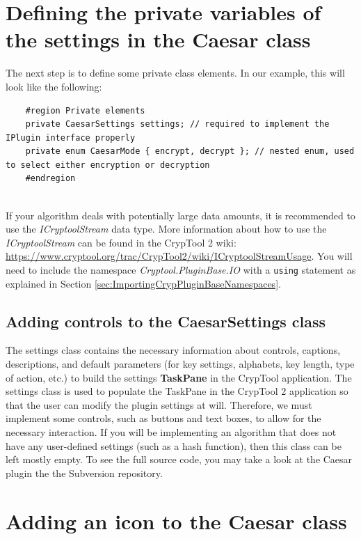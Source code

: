 \section{Defining the private variables of the settings in the Caesar class}
\label{sec:DefiningThePrivateVariablesOfTheSettingsInTheCaesarClass}

The next step is to define some private class elements. In our example, this will look like the following:

\begin{lstlisting}
	#region Private elements
	private CaesarSettings settings; // required to implement the IPlugin interface properly
	private enum CaesarMode { encrypt, decrypt }; // nested enum, used to select either encryption or decryption
	#endregion
\end{lstlisting}

\ \\
If your algorithm deals with potentially large data amounts, it is recommended to use the \textit{ICryptoolStream} data type. More information about how to use the \textit{ICryptoolStream} can be found in the CrypTool 2 wiki: \url{https://www.cryptool.org/trac/CrypTool2/wiki/ICryptoolStreamUsage}. You will need to include the namespace \textit{Cryptool.PluginBase.IO} with a \texttt{using} statement as explained in Section \ref{sec:ImportingCrypPluginBaseNamespaces}.

\subsection{Adding controls to the CaesarSettings class}
\label{sec:AddingControlsToTheCaesarSettingsClass}

The settings class contains the necessary information about controls, captions, descriptions, and default parameters (for key settings, alphabets, key length, type of action, etc.) to build the settings \textbf{TaskPane} in the CrypTool application. The settings class is used to populate the TaskPane in the CrypTool 2 application so that the user can modify the plugin settings at will. Therefore, we must implement some controls, such as buttons and text boxes, to allow for the necessary interaction. If you will be implementing an algorithm that does not have any user-defined settings (such as a hash function), then this class can be left mostly empty. To see the full source code, you may take a look at the Caesar plugin the the Subversion repository.
\clearpage

\section{Adding an icon to the Caesar class}
\label{sec:AddingAnIconToTheCaesarClass}


